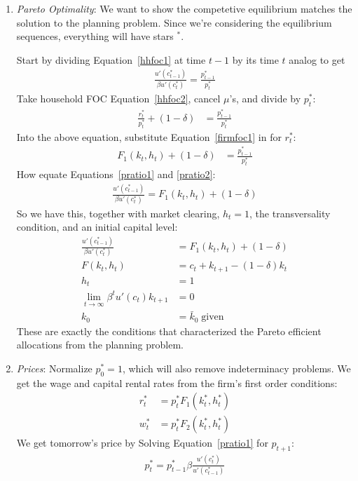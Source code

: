 \documentclass[12pt]{article}
\theoremstyle{plain}
\theoremstyle{definition}
\theoremstyle{remark}
\newcommand{\limt}{\lim_{t\rightarrow\infty}}
\begin{document}
\begin{enumerate}
  \item \emph{Pareto Optimality}: We want to show the competetive
    equilibrium matches the solution to the planning problem. Since
    we're considering the equilibrium sequences, everything will have
    stars ${}^*$.

    Start by dividing Equation~\ref{hhfoc1} at time $t-1$ by its time
    $t$ analog to get
    \begin{align}
      \frac{u'(c_{t-1}^*)}{\beta u'(c_{t}^*)} = \frac{p_{t-1}^*}{p_t^*}
      \label{pratio1}
    \end{align}
    Take household FOC Equation~\ref{hhfoc2}, cancel $\mu$'s, and divide
    by $p_t^*$:
    \begin{align*}
      \frac{r_t^*}{p_t^*} + (1-\delta)
      &= \frac{p_{t-1}^*}{p_t^*}
    \end{align*}
    Into the above equation, substitute Equation~\ref{firmfoc1} in for
    $r_t^*$:
    \begin{align}
      F_1(k_t,h_t) + (1-\delta)
      &= \frac{p_{t-1}^*}{p_t^*}
      \label{pratio2}
    \end{align}
    How equate Equations~\ref{pratio1} and \ref{pratio2}:
    \begin{align*}
      \frac{u'(c_{t-1}^*)}{\beta u'(c_{t}^*)}
      = F_1(k_t,h_t) + (1-\delta)
    \end{align*}
    So we have this, together with market clearing, $h_t=1$, the
    transversality condition, and an initial capital level:
    \begin{align*}
      \frac{u'(c_{t-1}^*)}{\beta u'(c_{t}^*)}
      &= F_1(k_t,h_t) + (1-\delta) \\
      F(k_t,h_t) &= c_t + k_{t+1} - (1-\delta) k_t \\
      h_t &= 1\\
      \limt \beta^t u'(c_t) k_{t+1}&=0\\
      k_0 &= \bar{k}_0 \; \text{given}
    \end{align*}
    These are exactly the conditions that characterized the Pareto
    efficient allocations from the planning problem.

  \item \emph{Prices}: Normalize $p_0^*=1$, which will also remove
    indeterminacy problems. We get the wage and capital rental rates
    from the firm's first order conditions:
    \begin{align*}
      r_t^* &= p_t^* F_1(k^*_t,h^*_t) \\
      w_t^* &= p_t^* F_2(k^*_t,h^*_t)
    \end{align*}
    We get tomorrow's price by Solving Equation~\ref{pratio1} for
    $p_{t+1}$:
    \begin{align}
       p_t^*
       = p_{t-1}^*\beta \frac{u'(c_{t}^*)}{u'(c_{t-1}^*)}
    \end{align}
\end{enumerate}
\end{document}
